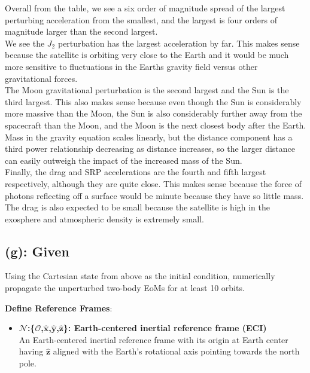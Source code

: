 \documentclass[titlepage]{article}
\begin{document}
\begin{mdframed}[linewidth=1pt, innertopmargin=10pt, innerbottommargin=10pt]
	Overall from the table, we see a six order of magnitude spread of the largest perturbing acceleration from the smallest, and the largest is four orders of magnitude larger than the second largest.\\
	
	We see the $J_2$ perturbation has the largest acceleration by far. This makes sense because the satellite is orbiting very close to the Earth and it would be much more sensitive to fluctuations in the Earths gravity field versus other gravitational forces.\\
	
	The Moon gravitational perturbation is the second largest and the Sun is the third largest. This also makes sense because even though the Sun is considerably more massive than the Moon, the Sun is also considerably further away from the spacecraft than the Moon, and the Moon is the next closest body after the Earth. Mass in the gravity equation scales linearly, but the distance component has a third power relationship decreasing as distance increases, so the larger distance can easily outweigh the impact of the increased mass of the Sun.\\
	
	Finally, the drag and SRP accelerations are the fourth and fifth largest respectively, although they are quite close. This makes sense because the force of photons reflecting off a surface would be minute because they have so little mass. The drag is also expected to be small because the satellite is high in the exosphere and atmospheric density is extremely small.\\
\end{mdframed}

\subsection*{(g): Given}
Using the Cartesian state from above as the initial condition, numerically propagate the unperturbed two-body EoMs for at least 10 orbits.

\textbf{Define Reference Frames}:
\begin{itemize}
	\item \textbf{$\mathcal{N}$:\{$\mathcal{O}$,$\hat{\boldsymbol{x}}$,$\hat{\boldsymbol{y}}$,$\hat{\boldsymbol{z}}$\}: Earth-centered inertial reference frame (ECI)\\}An Earth-centered inertial reference frame with its origin at Earth center having $\hat{\boldsymbol{z}}$ aligned with the Earth's rotational axis pointing towards the north pole.
\end{itemize}
\end{document}
